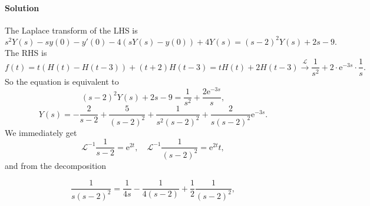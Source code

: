 \documentclass[hyperref, a4paper]{article}
\newcommand*{\ee}{\mathrm{e}}
\newcommand*{\invlaplace}{\mathcal{L}^{-1}}
\begin{document}
\paragraph*{Solution} The Laplace transform of the LHS is 
\[
    s^2 Y(s) - s y(0) - y'(0) 
    - 4 (s Y(s) - y(0)) 
    + 4 Y(s) = 
    (s-2)^2 Y(s) + 2s - 9.
\]
The RHS is 
\[
    f(t) = t (H(t) - H(t-3)) + (t + 2) H(t - 3) 
    = t H(t) + 2 H(t - 3) \stackrel{\mathcal{L}}{\longrightarrow}
    \frac{1}{s^2} + 2 \cdot \ee^{-3s} \cdot \frac{1}{s}.
\]
So the equation is equivalent to 
\[
    (s - 2)^2 Y(s) + 2s - 9 = \frac{1}{s^2} + \frac{2 \ee^{- 3s}}{s},
\]
\begin{equation}
    Y(s) = - \frac{2}{s - 2} + \frac{5}{(s - 2)^2}
    + \frac{1}{s^2 (s - 2)^2}
    + \frac{2}{s (s - 2)^2} \ee^{-3 s}.
\end{equation}
We immediately get 
\[
    \invlaplace \frac{1}{s-2} = \ee^{2t}, \quad 
    \invlaplace \frac{1}{(s-2)^2} = \ee^{2t} t, 
\]
and from the decomposition 

\[
    \frac{1}{s (s - 2)^2} = \frac{1}{4s} - \frac{1}{4 (s - 2)} + \frac{1}{2} \frac{1}{(s - 2)^2},
\]
\end{document}
